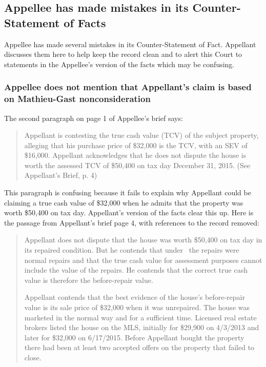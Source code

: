 \documentclass[12pt,\documentclassflag]{michiganCourtOfAppealsBrief}
\begin{document}
\subsection{Appellee has made mistakes in its Counter-Statement of Facts}

Appellee has made several mistakes in its Counter-Statement of Fact. Appellant discusses them here to help keep the record clean and to alert this Court to statements in the Appellee's version of the facts which may be confusing.

\subsubsection{Appellee does not mention that Appellant's claim is based on Mathieu-Gast nonconsideration}


The second paragraph on page 1 of Appellee's brief says:

\begin{quote}
Appellant is contesting the true cash value (TCV) of the subject property, alleging that his
purchase price of \$32,000 is the TCV, with an SEV of \$16,000. Appellant acknowledges that he
does not dispute the house is worth the assessed TCV of \$50,400 on tax day December 31, 2015. (See Appellant's Brief, p. 4)
\end{quote}

This paragraph is confusing because it fails to explain why Appellant could be claiming a true cash value of \$32,000 when he admits that the property was worth \$50,400 on tax day. Appellant's version of the facts clear this up. Here is the passage from Appellant's brief page 4, with references to the record removed:

\begin{quotation}
  Appellant does not dispute that the house was worth \$50,400 on tax day in its repaired condition. But he contends that under \mathieuGast\ the repairs were normal repairs and that the true cash value for assessment purposes cannot include the value of the repairs. He contends that the correct true cash value is therefore the before-repair value. 

Appellant contends that the best evidence of the house's before-repair value is its sale price of \$32,000 when it was unrepaired. The house was marketed in the normal way and for a sufficient time. Licensed real estate brokers listed the house on the MLS, initially for \$29,900 on 4/3/2013 and later for \$32,000 on 6/17/2015. Before Appellant bought the property there had been at least two accepted offers on the property that failed to close.
\end{quotation}
\end{document}
